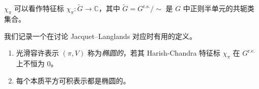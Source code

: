 \begin{remark}
$\chi_{\pi}$ 可以看作特征标 $\chi_{\pi}\colon\widetilde{G}\to\mathbb{C}$，其中
$\widetilde{G}=G^{\mathrm{r.s.}}/\sim$ 是 $G$ 中正则半单元的共轭类集合。
\end{remark}

\begin{remark}
我们记录一个在讨论 Jacquet--Langlands 对应时有用的定义。
\begin{enumerate}[label=(\arabic*),leftmargin=2.2em]
\item 光滑容许表示 $(\pi,V)$ 称为\emph{椭圆的}，若其 Harish-Chandra 特征标
      $\chi_{\pi}$ 在 $G^{\mathrm{r.e.}}$ 上不恒为 $0$。
\item 每个本质平方可积表示都是椭圆的。
\end{enumerate}
\end{remark}
